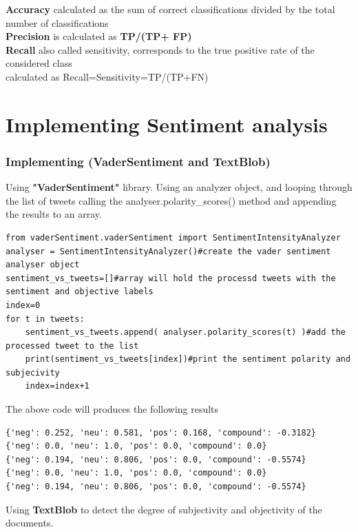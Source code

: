 \textbf{Accuracy} calculated as the sum of correct classifications divided by the total number of classifications\\
\textbf{Precision} is calculated as \textbf{ TP/(TP+ FP)}\\
\textbf{Recall} also called sensitivity, corresponds to the true positive rate of the considered class
\\
calculated as Recall=Sensitivity=TP/(TP+FN)

\clearpage



\chapter{Implementing Sentiment analysis}

\subsection{Implementing (VaderSentiment and TextBlob)}


Using \textbf{"VaderSentiment"} library. Using an analyzer object, and looping through the list of tweets  calling the analyser.polarity\_scores() method and appending the results to an array.

\begin{lstlisting}
from vaderSentiment.vaderSentiment import SentimentIntensityAnalyzer
analyser = SentimentIntensityAnalyzer()#create the vader sentiment analyser object
sentiment_vs_tweets=[]#array will hold the processd tweets with the sentiment and objective labels
index=0
for t in tweets:
    sentiment_vs_tweets.append( analyser.polarity_scores(t) )#add the processed tweet to the list
    print(sentiment_vs_tweets[index])#print the sentiment polarity and subjecivity
    index=index+1
\end{lstlisting}


The above code will produces the following results

\begin{lstlisting}
{'neg': 0.252, 'neu': 0.581, 'pos': 0.168, 'compound': -0.3182}
{'neg': 0.0, 'neu': 1.0, 'pos': 0.0, 'compound': 0.0}
{'neg': 0.194, 'neu': 0.806, 'pos': 0.0, 'compound': -0.5574}
{'neg': 0.0, 'neu': 1.0, 'pos': 0.0, 'compound': 0.0}
{'neg': 0.194, 'neu': 0.806, 'pos': 0.0, 'compound': -0.5574}
\end{lstlisting}




Using \textbf{TextBlob} to detect the degree of subjectivity and objectivity of the documents.


